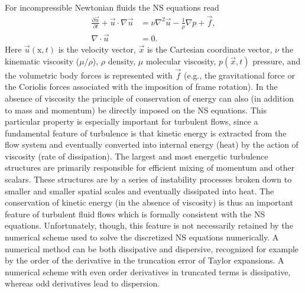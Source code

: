For incompressible Newtonian fluids the NS equations read
\begin{align}
 \frac{\partial \vec{u}}{\partial t}+\vec{u}\cdot \nabla \vec{u} &= \nu \nabla^2 \vec{u} -\frac{1}{\rho} \nabla p +\vec{f}, \label{eq:mortensen:NS}\\
 \nabla \cdot \vec{u} &=0.
 \label{eq:mortensen:cont}
\end{align}
Here $\vec{u}(\text{x},t)$ is the velocity vector, $\vec{x}$ is the
Cartesian coordinate vector, $\nu$ the kinematic viscosity
($\mu/\rho$), $\rho$ density, $\mu$ molecular viscosity,
$p(\vec{x},t)$ pressure, and the volumetric body forces is represented
with $\vec{f}$ (e.g., the gravitational force or the Coriolis forces
associated with the imposition of frame rotation). In the absence of
viscosity the principle of conservation of energy can also (in
addition to mass and momentum) be directly imposed on the NS
equations. This particular property is especially important for
turbulent flows, since a fundamental feature of turbulence is that
kinetic energy is extracted from the flow system and eventually
converted into internal energy (heat) by the action of viscosity (rate
of dissipation). The largest and most energetic turbulence structures
are primarily responsible for efficient mixing of momentum and other
scalars. These structures are by a series of instability processes
broken down to smaller and smaller spatial scales and eventually
dissipated into heat. The conservation of kinetic energy (in the
absence of viscosity) is thus an important feature of turbulent fluid
flows which is formally consistent with the NS
equations. Unfortunately, though, this feature is not necessarily
retained by the numerical scheme used to solve the discretized NS
equations numerically. A numerical method can be both dissipative and
dispersive, recognized for example by the order of the derivative in
the truncation error of Taylor expansions. A numerical scheme with
even order derivatives in truncated terms is dissipative, whereas odd
derivatives lead to dispersion.

